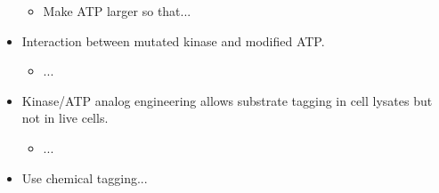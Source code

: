 \documentclass[../notes.tex]{subfiles}
\begin{document}
\begin{itemize}
\begin{itemize}
        \item Make ATP larger so that...
    \end{itemize}
    \item Interaction between mutated kinase and modified ATP.
    \begin{itemize}
        \item ...
    \end{itemize}
    \item Kinase/ATP analog engineering allows substrate tagging in cell lysates but not in live cells.
    \begin{itemize}
        \item ...
    \end{itemize}
    \item Use chemical tagging...
\end{itemize}
\end{document}
